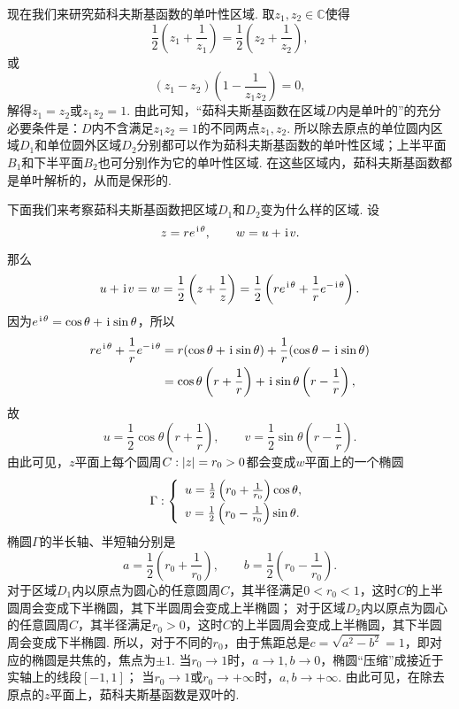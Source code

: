现在我们来研究茹科夫斯基函数的单叶性区域.
取\(z_1,z_2\in\mathbb{C}\)使得\begin{equation*}
\frac{1}{2} \left(z_1 + \frac{1}{z_1}\right)
= \frac{1}{2} \left(z_2 + \frac{1}{z_2}\right),
\end{equation*}或\begin{equation*}
(z_1-z_2)\left(1-\frac{1}{z_1 z_2}\right) = 0,
\end{equation*}解得\(z_1 = z_2\)或\(z_1 z_2 = 1\).
由此可知，“茹科夫斯基函数在区域\(D\)内是单叶的”的充分必要条件是：\(D\)内不含满足\(z_1 z_2 = 1\)的不同两点\(z_1,z_2\).
所以除去原点的单位圆内区域\(D_1\)和单位圆外区域\(D_2\)分别都可以作为茹科夫斯基函数的单叶性区域；上半平面\(B_1\)和下半平面\(B_2\)也可分别作为它的单叶性区域.
在这些区域内，茹科夫斯基函数都是单叶解析的，从而是保形的.

下面我们来考察茹科夫斯基函数把区域\(D_1\)和\(D_2\)变为什么样的区域.
设\begin{equation*}
z = r e^{\kern1pt\mathrm{i}\kern1pt\theta}, \qquad
w = u + \kern1pt\mathrm{i}\kern1pt v.
\end{equation*}那么\begin{equation*}
u + \kern1pt\mathrm{i}\kern1pt v = w
= \frac{1}{2} \left(z + \frac{1}{z}\right)
= \frac{1}{2} \left( r e^{\kern1pt\mathrm{i}\kern1pt\theta} + \frac{1}{r} e^{-\kern1pt\mathrm{i}\kern1pt\theta} \right).
\end{equation*}因为\(e^{\kern1pt\mathrm{i}\kern1pt\theta} = \cos\theta + \kern1pt\mathrm{i}\kern1pt \sin\theta\)，所以\begin{align*}
r e^{\kern1pt\mathrm{i}\kern1pt\theta} + \frac{1}{r} e^{-\kern1pt\mathrm{i}\kern1pt\theta}
&= r (\cos\theta + \kern1pt\mathrm{i}\kern1pt \sin\theta)
+ \frac{1}{r} (\cos\theta - \kern1pt\mathrm{i}\kern1pt \sin\theta) \\
&= \cos\theta \left( r + \frac{1}{r} \right)
+ \kern1pt\mathrm{i}\kern1pt \sin\theta \left( r - \frac{1}{r} \right),
\end{align*}故\begin{equation*}
u = \frac{1}{2} \cos\theta \left( r + \frac{1}{r} \right),
\qquad
v = \frac{1}{2} \sin\theta \left( r - \frac{1}{r} \right).
\end{equation*}由此可见，\(z\)平面上每个圆周\(C: \abs{z} = r_0 > 0\)都会变成\(w\)平面上的一个椭圆\begin{equation*}
\Gamma: \left\{ \def\arraystretch{1.5} \begin{array}{l}
u = \frac{1}{2} \left( r_0 + \frac{1}{r_0} \right) \cos\theta, \\
v = \frac{1}{2} \left( r_0 - \frac{1}{r_0} \right) \sin\theta.
\end{array} \right.
\end{equation*}椭圆\(\Gamma\)的半长轴、半短轴分别是\begin{equation*}
a = \frac{1}{2} \left( r_0 + \frac{1}{r_0} \right),
\qquad
b = \frac{1}{2} \left( r_0 - \frac{1}{r_0} \right).
\end{equation*}
对于区域\(D_1\)内以原点为圆心的任意圆周\(C\)，其半径满足\(0 < r_0 < 1\)，这时\(C\)的上半圆周会变成下半椭圆，其下半圆周会变成上半椭圆；
对于区域\(D_2\)内以原点为圆心的任意圆周\(C\)，其半径满足\(r_0 > 0\)，这时\(C\)的上半圆周会变成上半椭圆，其下半圆周会变成下半椭圆.
所以，对于不同的\(r_0\)，由于焦距总是\(c = \sqrt{a^2-b^2} = 1\)，即对应的椭圆是共焦的，焦点为\(\pm1\).
当\(r_0\to1\)时，\(a\to1,b\to0\)，椭圆“压缩”成接近于实轴上的线段\([-1,1]\)；
当\(r_0\to1\)或\(r_0\to+\infty\)时，\(a,b\to+\infty\).
由此可见，在除去原点的\(z\)平面上，茹科夫斯基函数是双叶的.

